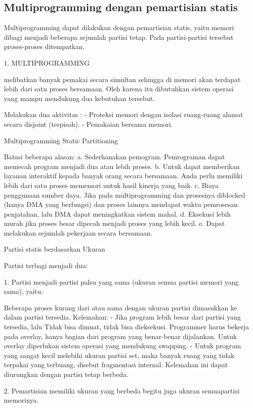 \subsection {Multiprogramming dengan pemartisian statis}
Multiprogramming dapat dilakukan dengan pemartisian statis, yaitu memori dibagi menjadi beberapa sejumlah partisi tetap. Pada partisi-partisi tersebut proses-proses ditempatkan.

1. MULTIPROGRAMMING

melibatkan banyak pemakai secara simultan sehingga di memori akan terdapat lebih dari satu proses bersamaan. Oleh karena itu dibutuhkan sistem operasi yang mampu mendukung dua kebutuhan tersebut.

Melakukan dua aktivitas :
- Proteksi memori dengan isolasi ruang-ruang alamat secara disjoint (terpisah).
- Pemakaian bersama memori.

Multiprogramming Static Partitioning

Batasi beberapa alasan:
a. Sederhanakan pemogram.
Pemrograman dapat memecah program menjadi dua atau lebih proses.
b. Untuk dapat memberikan layanan interaktif kepada banyak orang secara bersamaan.
Anda perlu memiliki lebih dari satu proses mememori
untuk hasil kinerja yang baik.
c. Biaya penggunaan sumber daya.
Jika pada multiprogramming dan prosesnya diblocked (hanya DMA
yang berfungsi) dan proses lainnya mendapat waktu pemrosesan penjatahan, lalu DMA
dapat meningkatkan sistem mahal.
d. Eksekusi lebih murah jika proses besar dipecah menjadi proses yang lebih kecil.
e. Dapat melakukan sejumlah pekerjaan secara bersamaan.


Partisi statis berdasarkan Ukuran

Partisi terbagi menjadi dua:

1. Partisi menjadi partisi palsu yang sama (ukuran semua partisi
memori yang sama), yaitu:

Beberapa proses kurang dari atau sama dengan ukuran partisi
dimasukkan ke dalam
partisi tersedia.
Kelemahan:
- Jika program lebih besar dari partisi yang tersedia, lalu
Tidak bisa dimuat, tidak bisa dieksekusi. Programmer harus bekerja pada overlay, hanya bagian dari program yang benar-benar dijalankan. Untuk overlay diperlukan sistem operasi yang mendukung swapping.
- Untuk program yang sangat kecil melebihi ukuran partisi
set, maka banyak ruang yang tidak terpakai yang terbuang,
disebut fragmentasi internal. Kelemahan ini dapat diurungkan dengan
partisi tetap berbeda.

2. Pemartisian memiliki ukuran yang berbeda begitu juga ukuran semuapartisi memorinya.

